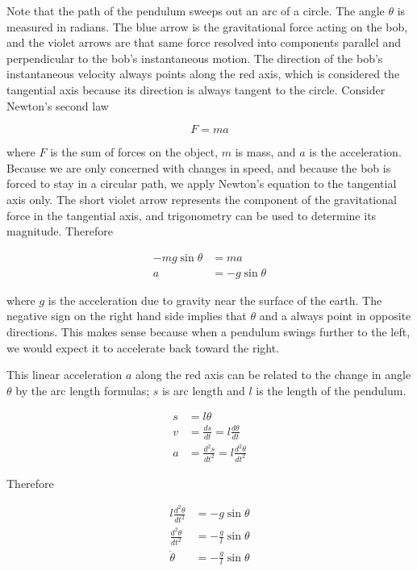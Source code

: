 Note that the path of the pendulum sweeps out an arc of a circle. The angle
$\theta$ is measured in radians. The blue arrow is the gravitational force
acting on the bob, and the violet arrows are that same force resolved into
components parallel and perpendicular to the bob's instantaneous motion. The
direction of the bob's instantaneous velocity always points along the red axis,
which is considered the tangential axis because its direction is always tangent
to the circle. Consider Newton's second law

\begin{equation*}
  F = ma
\end{equation*}

where $F$ is the sum of forces on the object, $m$ is mass, and $a$ is the
acceleration. Because we are only concerned with changes in speed, and because
the bob is forced to stay in a circular path, we apply Newton's equation to the
tangential axis only. The short violet arrow represents the component of the
gravitational force in the tangential axis, and trigonometry can be used to
determine its magnitude. Therefore

\begin{align*}
  -mg\sin\theta &= ma \\
  a &= -g\sin\theta
\end{align*}

where $g$ is the acceleration due to gravity near the surface of the earth. The
negative sign on the right hand side implies that $\theta$ and a always point in
opposite directions. This makes sense because when a pendulum swings further to
the left, we would expect it to accelerate back toward the right.

This linear acceleration $a$ along the red axis can be related to the change in
angle $\theta$ by the arc length formulas; $s$ is arc length and $l$ is the
length of the pendulum.

\begin{align}
  s &= l\theta \label{eq:arc_length} \\
  v &= \frac{ds}{dt} = l\frac{d\theta}{dt} \nonumber \\
  a &= \frac{d^2s}{dt^2} = l\frac{d^2\theta}{dt^2} \nonumber
\end{align}

Therefore

\begin{align*}
  l\frac{d^2\theta}{dt^2} &= -g\sin\theta \\
  \frac{d^2\theta}{dt^2} &= -\frac{g}{l}\sin\theta \\
  \ddot{\theta} &= -\frac{g}{l}\sin\theta
\end{align*}

